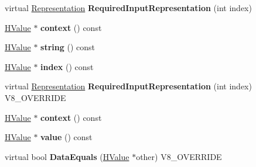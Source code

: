 \begin{DoxyCompactItemize}
\item 
\hypertarget{classv8_1_1internal_1_1_v8___f_i_n_a_l_a9c3e2a944e903467b6f0c68ec0ad8827}{}virtual \hyperlink{classv8_1_1internal_1_1_representation}{Representation} {\bfseries Required\+Input\+Representation} (int index)\label{classv8_1_1internal_1_1_v8___f_i_n_a_l_a9c3e2a944e903467b6f0c68ec0ad8827}

\item 
\hypertarget{classv8_1_1internal_1_1_v8___f_i_n_a_l_a8294bece2df148267ec52228e2139030}{}\hyperlink{classv8_1_1internal_1_1_h_value}{H\+Value} $\ast$ {\bfseries context} () const \label{classv8_1_1internal_1_1_v8___f_i_n_a_l_a8294bece2df148267ec52228e2139030}

\item 
\hypertarget{classv8_1_1internal_1_1_v8___f_i_n_a_l_ac051ac05697d5f2da3e4a43f64a6b951}{}\hyperlink{classv8_1_1internal_1_1_h_value}{H\+Value} $\ast$ {\bfseries string} () const \label{classv8_1_1internal_1_1_v8___f_i_n_a_l_ac051ac05697d5f2da3e4a43f64a6b951}

\item 
\hypertarget{classv8_1_1internal_1_1_v8___f_i_n_a_l_ae35cd4b0e5fed0e15fcbbaaad81399c5}{}\hyperlink{classv8_1_1internal_1_1_h_value}{H\+Value} $\ast$ {\bfseries index} () const \label{classv8_1_1internal_1_1_v8___f_i_n_a_l_ae35cd4b0e5fed0e15fcbbaaad81399c5}

\item 
\hypertarget{classv8_1_1internal_1_1_v8___f_i_n_a_l_a6c6d1f37f40b113d8f4062f1ffff7215}{}virtual \hyperlink{classv8_1_1internal_1_1_representation}{Representation} {\bfseries Required\+Input\+Representation} (int index) V8\+\_\+\+O\+V\+E\+R\+R\+I\+D\+E\label{classv8_1_1internal_1_1_v8___f_i_n_a_l_a6c6d1f37f40b113d8f4062f1ffff7215}

\item 
\hypertarget{classv8_1_1internal_1_1_v8___f_i_n_a_l_a8294bece2df148267ec52228e2139030}{}\hyperlink{classv8_1_1internal_1_1_h_value}{H\+Value} $\ast$ {\bfseries context} () const \label{classv8_1_1internal_1_1_v8___f_i_n_a_l_a8294bece2df148267ec52228e2139030}

\item 
\hypertarget{classv8_1_1internal_1_1_v8___f_i_n_a_l_a998b3feae0e84bbe080297551603911f}{}\hyperlink{classv8_1_1internal_1_1_h_value}{H\+Value} $\ast$ {\bfseries value} () const \label{classv8_1_1internal_1_1_v8___f_i_n_a_l_a998b3feae0e84bbe080297551603911f}

\item 
\hypertarget{classv8_1_1internal_1_1_v8___f_i_n_a_l_a7f4d45af1c12067191189fb1f32db617}{}virtual bool {\bfseries Data\+Equals} (\hyperlink{classv8_1_1internal_1_1_h_value}{H\+Value} $\ast$other) V8\+\_\+\+O\+V\+E\+R\+R\+I\+D\+E\label{classv8_1_1internal_1_1_v8___f_i_n_a_l_a7f4d45af1c12067191189fb1f32db617}


\end{DoxyCompactItemize}
